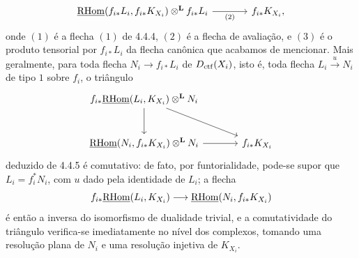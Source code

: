 \begin{prooftext}[Demonstração]
\begin{equation}
\begin{tikzcd}[column sep=large,row sep=large]
\uRHom(f_{i*}L_i,f_{i*}K_{X_i})\otimes^{\mathbf L} f_{i*}L_i
 \arrow[r,"(2)"'] &
f_{i*}K_{X_i},
\end{tikzcd}
\end{equation}
onde $(1)$ é a flecha $(1)$ de 4.4.4, $(2)$ é a flecha de avaliação, e $(3)$ é o produto tensorial por $f_{i*}L_i$ da flecha canônica que acabamos de mencionar. Mais geralmente, para toda flecha $N_i\longrightarrow f_{i*}L_i$ de $D_{\mathrm{ctf}}(X_i)$, isto é, toda flecha $L_i\xrightarrow{u}N_i$ de tipo $1$ sobre $f_i$, o triângulo
\[
\begin{tikzcd}[column sep=large,row sep=large]
f_{i*}\uRHom(L_i,K_{X_i})\otimes^{\mathbf L}N_i
 \arrow[dr] \arrow[d] & \\
\uRHom(N_i,f_{i*}K_{X_i})\otimes^{\mathbf L}N_i \arrow[r] &
f_{i*}K_{X_i}
\end{tikzcd}
\]
deduzido de 4.4.5 é comutativo: de fato, por funtorialidade, pode-se supor que $L_i=f_i^*N_i$, com $u$ dado pela identidade de $L_i$; a flecha
\[
f_{i*}\underline{\mathrm{RHom}}(L_i,K_{X_i})\longrightarrow\underline{\mathrm{RHom}}(N_i,f_{i*}K_{X_i})
\]
é então a inversa do isomorfismo de dualidade trivial, e a comutatividade do triângulo verifica-se imediatamente no nível dos complexos, tomando uma resolução plana de $N_i$ e uma resolução injetiva de $K_{X_i}$.


\end{prooftext}
